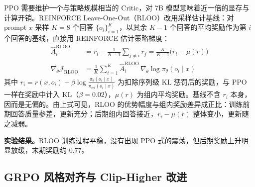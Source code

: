 \documentclass[fontset=fandol,type=master,campus=shenzhen,etitleauto=true]{hithesisbook}
\begin{document}
PPO 需要维护一个与策略规模相当的 Critic，对 7B 模型意味着近一倍的显存与计算开销。REINFORCE Leave-One-Out（RLOO）\cite{ref88}改用采样估计基线：对 prompt $x$ 采样 $K = 8$ 个回答 $\{o_i\}_{i=1}^{K}$，以其余 $K - 1$ 个回答的平均奖励作为第 $i$ 个回答的基线，直接用 REINFORCE 估计策略梯度：
\begin{equation}\label{eq:rloo}
\begin{aligned}
\hat{A}_i^{\text{RLOO}} &= r_i - \frac{1}{K - 1} \sum_{j \ne i} r_j = \frac{K}{K - 1}\bigl(r_i - \mu(r)\bigr) \\
\nabla_\theta \mathcal{J}_{\text{RLOO}} &= \frac{1}{K} \sum_{i=1}^{K} \hat{A}_i^{\text{RLOO}}\, \nabla_\theta \log \pi_\theta(o_i \mid x)
\end{aligned}
\end{equation}
其中 $r_i = r(x, o_i) - \beta \log \frac{\pi_\theta(o_i \mid x)}{\pi_{\text{ref}}(o_i \mid x)}$ 为扣除序列级 KL 惩罚后的奖励，与 PPO 一样在奖励中计入 KL（$\beta = 0.02$），$\mu(r)$ 为组内平均奖励。基线不含 $r_i$ 本身，因而是无偏的。由上式可见，RLOO 的优势幅度与组内奖励差异成正比：训练前期回答质量参差，更新充分；后期组内回答接近，$r_i - \mu(r)$ 整体变小，更新随之减弱。

\textbf{实验结果。}RLOO 训练过程平稳，没有出现 PPO 式的震荡，但后期奖励上升明显放缓，末期奖励约 0.77。

\subsection{GRPO 风格对齐与 Clip-Higher 改进}\label{grpo-ux98ceux683cux5bf9ux9f50ux4e0e-clip-higher-ux6539ux8fdb}
\end{document}
